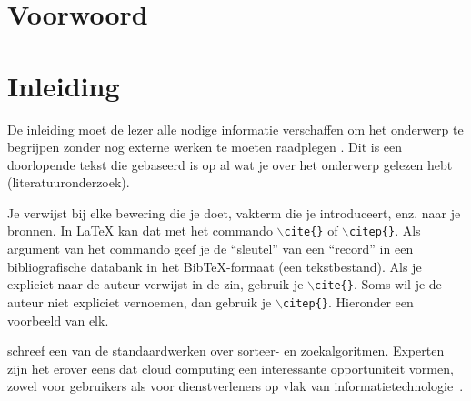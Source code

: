 \documentclass[pdftex,a4paper,12pt,twoside]{report}
\begin{document}

\inserttitlepage


\begin{abstract}
  \lipsum[1-4]
\end{abstract}

\chapter*{Voorwoord}
\label{ch:voorwoord}

\lipsum[5-6]

\tableofcontents



\chapter{Inleiding}
\label{ch:inleiding}

De inleiding moet de lezer alle nodige informatie verschaffen om het onderwerp te begrijpen zonder nog externe werken te moeten raadplegen \citep{Pollefliet2011}. Dit is een doorlopende tekst die gebaseerd is op al wat je over het onderwerp gelezen hebt (literatuuronderzoek).

Je verwijst bij elke bewering die je doet, vakterm die je introduceert, enz. naar je bronnen. In \LaTeX{} kan dat met het commando \texttt{$\backslash${cite\{\}}} of \texttt{$\backslash${citep\{\}}}. Als argument van het commando geef je de ``sleutel'' van een ``record'' in een bibliografische databank in het Bib\TeX{}-formaat (een tekstbestand). Als je expliciet naar de auteur verwijst in de zin, gebruik je \texttt{$\backslash${}cite\{\}}.
Soms wil je de auteur niet expliciet vernoemen, dan gebruik je \texttt{$\backslash${}citep\{\}}. Hieronder een voorbeeld van elk.

\cite{Knuth1998} schreef een van de standaardwerken over sorteer- en zoekalgoritmen. Experten zijn het erover eens dat cloud computing een interessante opportuniteit vormen, zowel voor gebruikers als voor dienstverleners op vlak van informatietechnologie~\citep{Creeger2009}.
\end{document}
